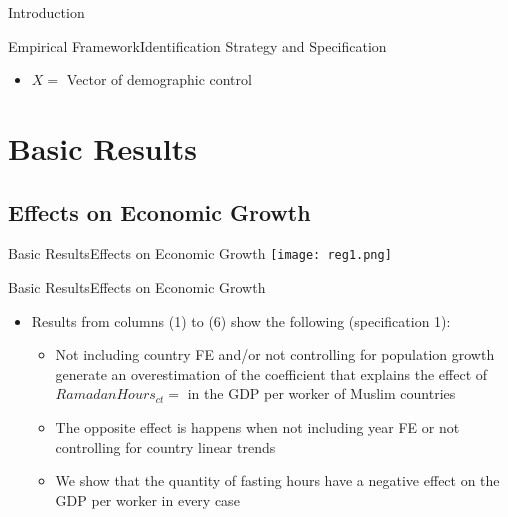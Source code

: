 \documentclass[pdftex,12pt,xcolor=pdftex,table]{beamer}
\begin{document}
\begin{frame}{Introduction}
\begin{frame}{Empirical Framework}{Identification Strategy and Specification}
\begin{itemize}
    year $t$
    \item<3-> $X=$ Vector of demographic control
    \end{itemize}
    \end{frame}
    
\section{Basic Results}

\subsection{Effects on Economic Growth}

    \begin{frame}{Basic Results}{Effects on Economic Growth}
    \vspace{-0.57cm}
    \centering\texttt{[image: reg1.png]}
    \end{frame}
    
    \begin{frame}{Basic Results}{Effects on Economic Growth}
    \begin{itemize}
        \item Results from columns (1) to (6) show the following (specification 1):
        \begin{itemize}
            \item<2-> Not including country FE and/or not controlling for population growth generate an overestimation of the coefficient that explains the effect of $RamadanHours_{ct}=$ in the GDP per worker of Muslim countries
            \item<3-> The opposite effect is happens when not including year FE or not controlling for country linear trends
            \item<4-> We show that the quantity of fasting hours have a negative effect on the GDP per worker in every case
        \end{itemize}
    \end{itemize}
    \end{frame}
    

\end{frame}
\end{document}
